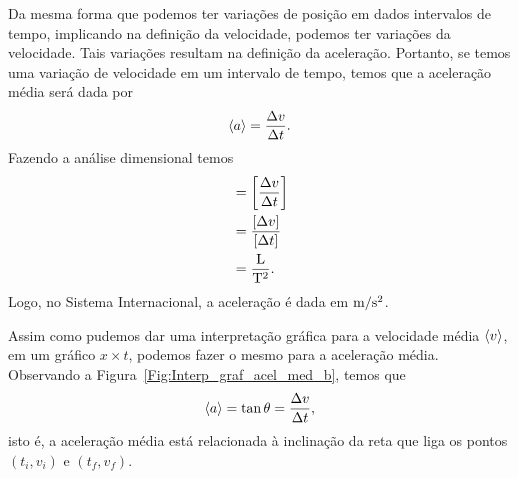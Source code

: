 Da mesma forma que podemos ter variações de posição em dados intervalos de tempo, implicando na definição da velocidade, podemos ter variações da velocidade. Tais variações resultam na definição da aceleração. Portanto, se temos uma variação de velocidade em um intervalo de tempo, temos que a aceleração média será dada por
\begin{equation}
  \left\langle{a}\right\rangle = \frac{\Delta v}{\Delta t}.
\end{equation}
%
Fazendo a análise dimensional temos
\begin{align}
	[\mean{a}] &= \left[\frac{\Delta v}{\Delta t}\right] \\
		&= \frac{[\Delta v]}{[\Delta t]} \\
		&= \frac{\rm{L}}{\rm{T}^2}.
\end{align}
%
Logo, no Sistema Internacional, a aceleração é dada em $\rm{m}/\rm{s}^2$.

Assim como pudemos dar uma interpretação gráfica para a velocidade média $\left\langle{v}\right\rangle$, em um gráfico $x \times t$, podemos fazer o mesmo para a aceleração média. Observando a Figura~\ref{Fig:Interp_graf_acel_med_b}, temos que
\begin{equation}
	\left\langle{a}\right\rangle = \tan \theta = \frac{\Delta v}{\Delta t},
\end{equation}
%
isto é, a aceleração média está relacionada à inclinação da reta que liga os pontos $(t_i, v_i)$ e $(t_f, v_f)$.

